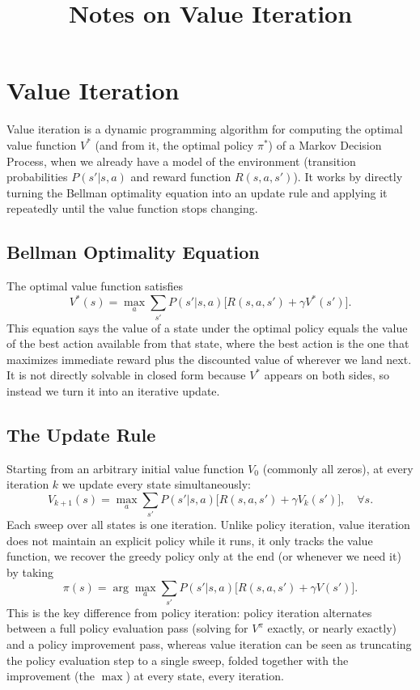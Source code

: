 \documentclass[conference]{IEEEtran}
\title{Notes on Value Iteration}
\author{
\IEEEauthorblockN{Luis Mendez}
}
\begin{document}
\maketitle

\section*{Value Iteration}
Value iteration is a dynamic programming algorithm for computing the optimal value function $V^*$ (and from it, the optimal policy $\pi^*$) of a Markov Decision Process, when we already have a model of the environment (transition probabilities $P(s'|s,a)$ and reward function $R(s,a,s')$). It works by directly turning the Bellman optimality equation into an update rule and applying it repeatedly until the value function stops changing.

\subsection*{Bellman Optimality Equation}
The optimal value function satisfies
\[
    V^*(s) = \max_{a} \sum_{s'} P(s'|s,a)\big[R(s,a,s') + \gamma V^*(s')\big].
\]
This equation says the value of a state under the optimal policy equals the value of the best action available from that state, where the best action is the one that maximizes immediate reward plus the discounted value of wherever we land next. It is not directly solvable in closed form because $V^*$ appears on both sides, so instead we turn it into an iterative update.

\subsection*{The Update Rule}
Starting from an arbitrary initial value function $V_0$ (commonly all zeros), at every iteration $k$ we update every state simultaneously:
\[
    V_{k+1}(s) = \max_{a} \sum_{s'} P(s'|s,a)\big[R(s,a,s') + \gamma V_k(s')\big], \quad \forall s.
\]
Each sweep over all states is one iteration. Unlike policy iteration, value iteration does not maintain an explicit policy while it runs, it only tracks the value function, we recover the greedy policy only at the end (or whenever we need it) by taking
\[
    \pi(s) = \arg\max_{a} \sum_{s'} P(s'|s,a)\big[R(s,a,s') + \gamma V(s')\big].
\]
This is the key difference from policy iteration: policy iteration alternates between a full policy evaluation pass (solving for $V^\pi$ exactly, or nearly exactly) and a policy improvement pass, whereas value iteration can be seen as truncating the policy evaluation step to a single sweep, folded together with the improvement (the $\max$) at every state, every iteration.
\end{document}
